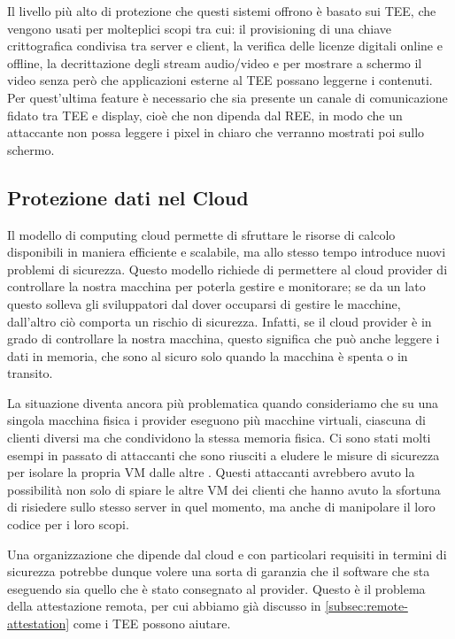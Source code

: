 \documentclass[12pt,italian]{report}
\begin{document}
Il livello più alto di protezione che questi sistemi offrono è basato sui TEE,
che vengono usati per molteplici scopi tra cui: il provisioning di una chiave
crittografica condivisa tra server e client, la verifica delle licenze digitali
online e offline, la decrittazione degli stream audio/video e per mostrare
a schermo il video senza però che applicazioni esterne al TEE possano leggerne
i contenuti.
Per quest'ultima feature è necessario che sia presente un canale di
comunicazione fidato tra TEE e display, cioè che non dipenda dal REE, in modo
che un attaccante non possa leggere i pixel in chiaro che verranno mostrati poi
sullo schermo.

\subsection{Protezione dati nel Cloud}
\label{subsec:protezione-dati-cloud}
Il modello di computing cloud permette di sfruttare le risorse di calcolo
disponibili in maniera efficiente e scalabile, ma allo stesso tempo introduce
nuovi problemi di sicurezza.
Questo modello richiede di permettere al cloud provider di controllare la
nostra macchina per poterla gestire e monitorare; se da un lato questo solleva
gli sviluppatori dal dover occuparsi di gestire le macchine, dall'altro ciò
comporta un rischio di sicurezza.
Infatti, se il cloud provider è in grado di controllare la nostra macchina,
questo significa che può anche leggere i dati in memoria, che sono al sicuro
solo quando la macchina è spenta o in transito.

La situazione diventa ancora più problematica quando consideriamo che su
una singola macchina fisica i provider eseguono più macchine virtuali, ciascuna
di clienti diversi ma che condividono la stessa memoria fisica.
Ci sono stati molti esempi in passato di attaccanti che sono riusciti a eludere
le misure di sicurezza per isolare la propria VM dalle altre
\cite{vmescape1}\cite{vmescape2}\cite{vmescape3}.
Questi attaccanti avrebbero avuto la possibilità non solo di spiare le altre
VM dei clienti che hanno avuto la sfortuna di risiedere sullo stesso server in
quel momento, ma anche di manipolare il loro codice per i loro scopi.

Una organizzazione che dipende dal cloud e con particolari requisiti in
termini di sicurezza potrebbe dunque volere una sorta di garanzia che il
software che sta eseguendo sia quello che è stato consegnato al provider.
Questo è il problema della attestazione remota, per cui abbiamo già discusso
in \ref{subsec:remote-attestation} come i TEE possono aiutare.
\end{document}
